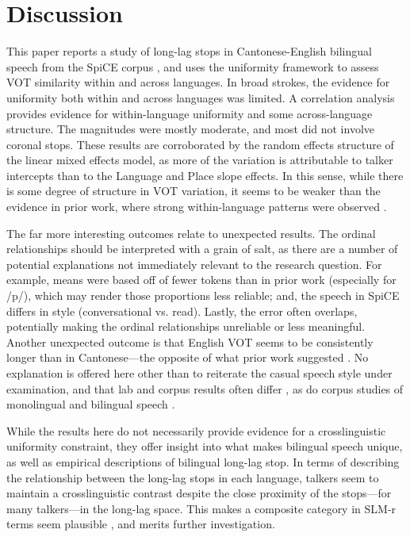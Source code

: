 \section{Discussion}

This paper reports a study of long-lag stops in Cantonese-English bilingual speech from the SpiCE corpus \citep{johnson_2020_spice}, and uses the uniformity framework to assess VOT similarity within and across languages. In broad strokes, the evidence for uniformity both within and across languages was limited. A correlation analysis provides evidence for within-language uniformity and some across-language structure. The magnitudes were mostly moderate, and most did not involve coronal stops. These results are corroborated by the random effects structure of the linear mixed effects model, as more of the variation is attributable to talker intercepts than to the Language and Place slope effects. In this sense, while there is some degree of structure in VOT variation, it seems to be weaker than the evidence in prior work, where strong within-language patterns were observed \citep{chodroff_2017_structure,chodroff_2019_l2}.

The far more interesting outcomes relate to unexpected results. The ordinal relationships should be interpreted with a grain of salt, as there are a number of potential explanations not immediately relevant to the research question. For example, means were based off of fewer tokens than in prior work (especially for /p/), which may render those proportions less reliable; and, the speech in SpiCE differs in style (conversational vs. read). Lastly, the error often overlaps, potentially making the ordinal relationships unreliable or less meaningful. Another unexpected outcome is that English VOT seems to be consistently longer than in Cantonese---the opposite of what prior work suggested \citep{clumeck_1981_cantonese,lisker_1964_vot}. No explanation is offered here other than to reiterate the casual speech style under examination, and that lab and corpus results often differ \citep{gahl_2012_reduce}, as do corpus studies of monolingual and bilingual speech \citep{johnson_2019_probabilistic}. 

While the results here do not necessarily provide evidence for a crosslinguistic uniformity constraint, they offer insight into what makes bilingual speech unique, as well as empirical descriptions of bilingual long-lag stop. In terms of describing the relationship between the long-lag stops in each language, talkers seem to maintain a crosslinguistic contrast despite the close proximity of the stops---for many talkers---in the long-lag space. This makes a composite category in SLM-r terms seem plausible \citep{flege_2021_slmr}, and merits further investigation. 

